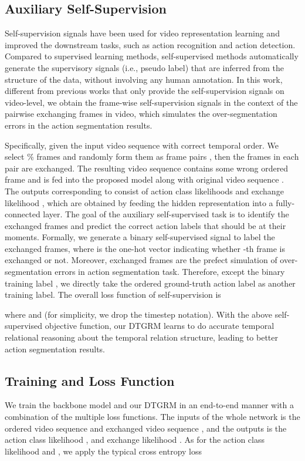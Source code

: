 \documentclass[letterpaper]{article} \usepackage{aaai21}  \usepackage{times}  \usepackage{helvet} \usepackage{courier}  \usepackage[hyphens]{url}  \usepackage{graphicx} \usepackage{mathtools}
\begin{document}
\subsection{Auxiliary Self-Supervision}
Self-supervision signals have been used for video representation learning \cite{misra2016shuffle,lee2017unsupervised,fernando2017self,korbar2018cooperative} and improved the downstream tasks, such as action recognition and action detection. Compared to supervised learning methods, self-supervised methods automatically generate the supervisory signals (i.e., pseudo label) that are inferred from the structure of the data, without involving any human annotation. In this work, different from previous works that only provide the self-supervision signals on video-level, we obtain the frame-wise self-supervision signals in the context of the pairwise exchanging frames in video, which simulates the over-segmentation errors in the action segmentation results.

Specifically, given the input video sequence  with correct temporal order. We select \% frames and randomly form them as frame pairs , then the frames in each pair are exchanged. The resulting video sequence  contains some wrong ordered frame and is fed into the proposed model along with original video sequence . The outputs corresponding to  consist of action class likelihoods  and exchange likelihood , which are obtained by feeding the hidden representation  into a fully-connected layer. The goal of the auxiliary self-supervised task is to identify the exchanged frames and predict the correct action labels that should be at their moments. Formally, we generate a binary self-supervised signal  to label the exchanged frames, where  is the one-hot vector indicating whether -th frame is exchanged or not. Moreover, exchanged frames are the prefect simulation of over-segmentation errors in action segmentation task. Therefore, except the binary training label , we directly take the ordered ground-truth action label  as another training label. The overall loss function of self-supervision is

where  and  (for simplicity, we drop the timestep notation). With the above self-supervised objective function, our DTGRM learns to do accurate temporal relational reasoning about the temporal relation structure, leading to better action segmentation results.

\subsection{Training and Loss Function}
We train the backbone model and our DTGRM in an end-to-end manner with a combination of the multiple loss functions. The inputs of the whole network is the ordered video sequence  and exchanged video sequence , and the outputs is the action class likelihood ,  and exchange likelihood . As for the action class likelihood  and , we apply the typical cross entropy loss
\end{document}
